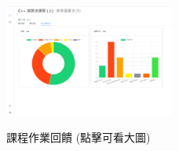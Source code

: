 \documentclass[12pt]{article}
\begin{document}
\begin{enumerate}

    \begin{figure}[H]
      \centering
      \href{https://raw.githubusercontent.com/programingtw/proglearn-plan/main/img/feedback.png}{ 
        \includegraphics[width=0.5\textwidth]{./img/feedback.png}
      }
      \caption{課程作業回饋 (點擊可看大圖)}
      \label{arc9}
    \end{figure}
    

\end{enumerate}
\end{document}
